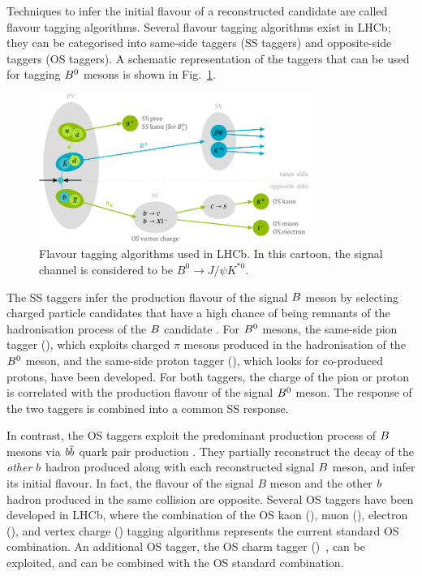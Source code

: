 Techniques to infer the initial flavour of a reconstructed
candidate are called flavour tagging algorithms.
Several flavour tagging algorithms exist in LHCb; they can be categorised into
same-side taggers (SS taggers) and opposite-side taggers (OS taggers). A
schematic representation of the taggers that can be used for tagging $B^0$
mesons is shown in Fig.~\ref{fig:FTscheme}.
\begin{figure}[t]
	\begin{center}
		\includegraphics[width=0.8\textwidth]{04Flavourtagging/figs/FlavourTaggerScheme.pdf}
	\end{center}
        \vspace{-2mm}
	\caption{Flavour tagging algorithms used in LHCb. In this cartoon, the signal channel is considered to be $B^0\to J/\psi K^{*0}$.}
	\label{fig:FTscheme}
\end{figure}

The SS taggers infer the production flavour of the signal $B$ meson by selecting
charged particle candidates that have a high chance of being remnants of the
hadronisation process of the $B$ candidate
\cite{LHCb-PAPER-2016-039}. For $B^0$ mesons, the same-side
pion tagger (\SSpi), which exploits charged $\pi$ mesons produced in the hadronisation of the
$B^0$ meson, and the same-side proton tagger (\SSp), which looks for co-produced
protons, have been developed. For both taggers, the charge of the pion or proton is correlated with the production flavour of the signal $B^0$ meson.
The response of the two taggers is combined into a
common SS response.

In contrast, the OS taggers exploit the predominant production process of $B$
mesons via $b\overline {b}$ quark pair production \cite{LHCb-PAPER-2011-027}. They
partially reconstruct the decay of the \emph{other} $b$ hadron produced along with each
reconstructed signal $B$ meson, and infer its initial flavour. In fact, the flavour of the signal
$B$ meson and the other $b$ hadron produced in the same collision are opposite.
Several OS taggers have been developed in LHCb, where the combination of the
OS kaon (\OSK), muon (\OSmu), electron (\OSe), and vertex charge (\OSvtx) tagging algorithms represents the
current standard OS combination. An additional OS tagger, the OS charm
tagger (\OSc)~\cite{LHCb-PAPER-2015-027}, can be exploited, and can be combined with
the OS standard combination.

